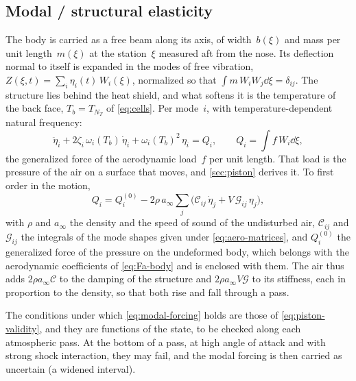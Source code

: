 \subsection{Modal / structural elasticity}\label{sec:modal}

The body is carried as a free beam along its axis, of width~$b(\xi)$ and
mass per unit length~$m(\xi)$ at the station~$\xi$ measured aft from the
nose. Its deflection normal to itself is expanded in the modes of free
vibration, $Z(\xi,t) = \sum_i \eta_i(t)\,W_i(\xi)$, normalized so that
$\int m\,W_iW_j\dd\xi = \delta_{ij}$. The structure lies behind the heat
shield, and what softens it is the temperature of the back face,
$T_b = T_{N_T}$ of \cref{eq:cells}. Per mode~$i$, with
temperature-dependent natural frequency:
\begin{equation}\label{eq:modal}
  \ddot\eta_i + 2\zeta_i\,\omega_i(T_b)\,\dot\eta_i
  + \omega_i(T_b)^2\,\eta_i
  = Q_i,
  \qquad
  Q_i = \int f\,W_i\dd\xi ,
\end{equation}
the generalized force of the aerodynamic load~$f$ per unit length. That load
is the pressure of the air on a surface that moves, and \cref{sec:piston}
derives it. To first order in the motion,
\begin{equation}\label{eq:modal-forcing}
  Q_i = Q_i^{(0)} - 2\rho\,a_\infty\sum_j
        \bigl(\mathcal{C}_{ij}\,\dot\eta_j + V\,\mathcal{G}_{ij}\,\eta_j\bigr),
\end{equation}
with $\rho$ and $a_\infty$ the density and the speed of sound of the
undisturbed air, $\mathcal{C}_{ij}$ and $\mathcal{G}_{ij}$ the integrals of
the mode shapes given under \cref{eq:aero-matrices}, and $Q_i^{(0)}$ the
generalized force of the pressure on the undeformed body, which belongs with
the aerodynamic coefficients of \cref{eq:Fa-body} and is enclosed with them.
The air thus adds $2\rho a_\infty\mathcal{C}$ to the damping of the
structure and $2\rho a_\infty V\mathcal{G}$ to its stiffness, each in
proportion to the density, so that both rise and fall through a pass.

The conditions under which \cref{eq:modal-forcing} holds are those of
\cref{eq:piston-validity}, and they are functions of the state, to be
checked along each atmospheric pass. At the bottom of a pass, at high angle
of attack and with strong shock interaction, they may fail, and the modal
forcing is then carried as uncertain (a widened interval).



